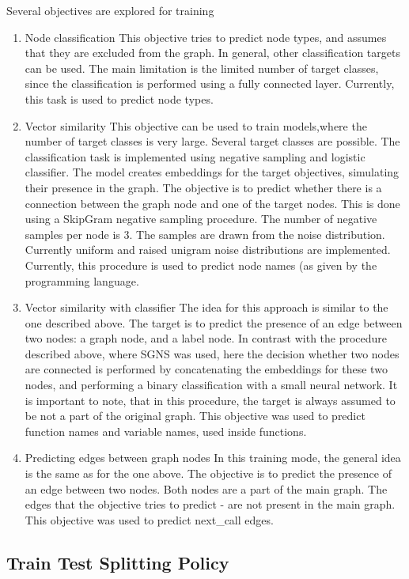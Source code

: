 \documentclass[a4paper,twoside]{article}
\begin{document}
Several objectives are explored for training 
\begin{enumerate}
    \item Node classification
    This objective tries to predict node types, and assumes that they are excluded from the graph. In general, other classification targets can be used. The main limitation is the limited number of target classes, since the classification is performed using a fully connected layer. Currently, this task is used to predict node types. 
    \item Vector similarity
    This objective can be used to train models,where the number of target classes is very large. Several target classes are possible. The classification task is implemented using negative sampling and logistic classifier. The model creates embeddings for the target objectives, simulating their presence in the graph. The objective is to predict whether there is a connection between the graph node and one of the target nodes. This is done using a SkipGram negative sampling procedure. The number of negative samples per node is 3. The samples are drawn from the noise distribution. Currently uniform and raised unigram noise distributions are implemented. Currently, this procedure is used to predict node names (as given by the programming language. 
    \item Vector similarity with classifier
    The idea for this approach is similar to the one described above. The target is to predict the presence of an edge between two nodes: a graph node, and a label node. In contrast with the procedure described above, where SGNS was used, here the decision whether two nodes are connected is performed by concatenating the embeddings for these two nodes, and performing a binary classification with a small neural network. It is important to note, that in this procedure, the target is always assumed to be not a part of the original graph. This objective was used to predict function names and variable names, used inside functions.
    \item Predicting edges between graph nodes
    In this training mode, the general idea is the same as for the one above. The objective is to predict the presence of an edge between two nodes. Both nodes are a part of the main graph. The edges that the objective tries to predict - are not present in the main graph. This objective was used to predict next\_call edges.
\end{enumerate}

\subsection{Train Test Splitting Policy}
\end{document}
